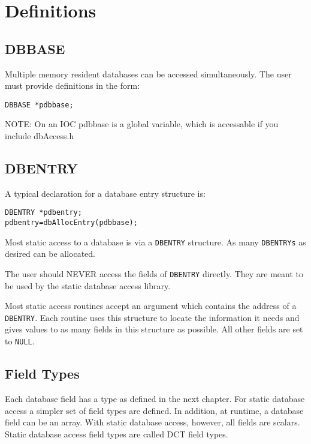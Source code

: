 \section{Definitions}

\subsection{DBBASE}

Multiple memory resident databases can be accessed simultaneously.
The user must provide definitions in the form:

\begin{verbatim}
DBBASE *pdbbase;
\end{verbatim}

NOTE: On an IOC pdbbase is a global variable, which is accessable if you include dbAccess.h

\subsection{DBENTRY}

A typical declaration for a database entry structure is:

\begin{verbatim}
DBENTRY *pdbentry;
pdbentry=dbAllocEntry(pdbbase);
\end{verbatim}

Most static access to a database is via a \verb|DBENTRY| structure.
As many \verb|DBENTRYs| as desired can be allocated.

The user should NEVER access the fields of \verb|DBENTRY| directly.
They are meant to be used by the static database access library.

Most static access routines accept an argument which contains the address of a \verb|DBENTRY|.
Each routine uses this structure to locate the information it needs and gives values to as many fields in this structure as possible.
All other fields are set to \verb|NULL|.

\subsection{Field Types}
\label{subsec:Field Types}

Each database field has a type as defined in the next chapter.
For static database access a simpler set of field types are defined.
In addition, at runtime, a database field can be an array.
With static database access, however, all fields are scalars.
Static database access field types are called DCT field types.

